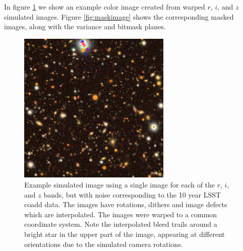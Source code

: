 \documentclass[twocolumn,twocolappendix,astrosym]{openjournal}
\begin{document}
In figure \ref{fig:colorimage} we show an example color image created from
warped $r$, $i$, and $z$ simulated images.  Figure \ref{fig:maskimage} shows
the corresponding masked images, along with the variance and bitmask planes.

\begin{figure}
    \begin{center}
    \includegraphics[width=0.65\textwidth]{example-image.jpg}
    \caption{
        Example simulated image using a single image for each of the $r$, $i$,
        and $z$ bands, but with noise corresponding to the 10 year LSST coadd data.
        The images have rotations, dithers and image defects which are interpolated.
        The images were warped to a common coordinate system.
        Note the interpolated bleed trails around a bright star in the upper
        part of the image, appearing at different orientations due to the
        simulated camera rotations.
    } \label{fig:colorimage}
    \end{center}
\end{figure}
\end{document}
